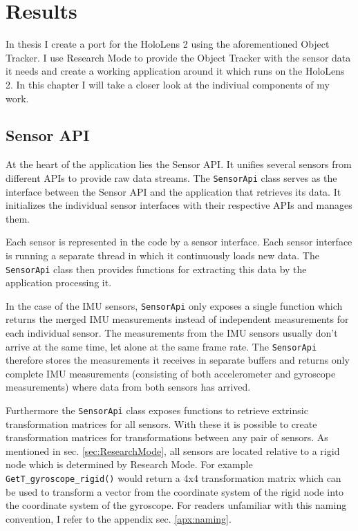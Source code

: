 \chapter{Results}

In thesis I create a port for the HoloLens 2 using the aforementioned Object Tracker. I use Research Mode \cite{ResearchMode} to provide the Object Tracker with the sensor data it needs and create a working application around it which runs on the HoloLens 2. In this chapter I will take a closer look at the indiviual components of my work.

\section{Sensor API}\label{sec:sensorapi}

At the heart of the application lies the Sensor API. It unifies several sensors from different APIs to provide raw data streams. The \lstinline{SensorApi} class serves as the interface between the Sensor API and the application that retrieves its data. It initializes the individual sensor interfaces with their respective APIs and manages them.

Each sensor is represented in the code by a sensor interface. Each sensor interface is running a separate thread in which it continuously loads new data. The \lstinline{SensorApi} class then provides functions for extracting this data by the application processing it. 

In the case of the IMU sensors, \lstinline{SensorApi} only exposes a single function which returns the merged IMU measurements instead of independent measurements for each individual sensor. The measurements from the IMU sensors usually don't arrive at the same time, let alone at the same frame rate. The \lstinline{SensorApi} therefore stores the measurements it receives in separate buffers and returns only complete IMU measurements (consisting of both accelerometer and gyroscope measurements) where data from both sensors has arrived. 

Furthermore the \lstinline{SensorApi} class exposes functions to retrieve extrinsic transformation matrices for all sensors. With these it is possible to create transformation matrices for transformations between any pair of sensors. As mentioned in sec. \ref{sec:ResearchMode}, all sensors are located relative to a rigid node which is determined by Research Mode. For example \lstinline{GetT_gyroscope_rigid()} would return a 4x4 transformation matrix which can be used to transform a vector from the coordinate system of the rigid node into the coordinate system of the gyroscope. For readers unfamiliar with this naming convention, I refer to the appendix sec. \ref{apx:naming}.

